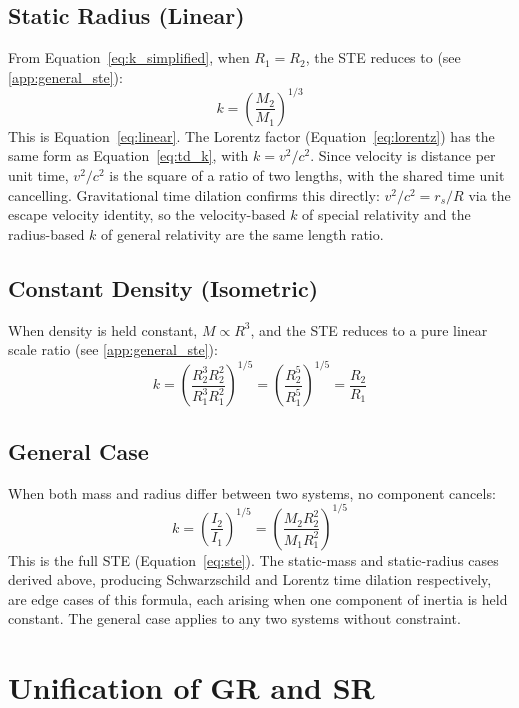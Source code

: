 \subsection{Static Radius (Linear)}
From Equation~\ref{eq:k_simplified}, when $R_1 = R_2$, the STE reduces to (see \ref{app:general_ste}):
\begin{equation}
k = \left(\frac{M_2}{M_1}\right)^{1/3}
\end{equation}
This is Equation~\ref{eq:linear}. The Lorentz factor (Equation~\ref{eq:lorentz}) has the same form as Equation~\ref{eq:td_k}, with $k = v^2/c^2$. Since velocity is distance per unit time, $v^2/c^2$ is the square of a ratio of two lengths, with the shared time unit cancelling. Gravitational time dilation confirms this directly: $v^2/c^2 = r_s/R$ via the escape velocity identity, so the velocity-based $k$ of special relativity and the radius-based $k$ of general relativity are the same length ratio.

\subsection{Constant Density (Isometric)}
When density is held constant, $M \propto R^3$, and the STE reduces to a pure linear scale ratio (see \ref{app:general_ste}):
\begin{equation}
k = \left(\frac{R_2^3 R_2^2}{R_1^3 R_1^2}\right)^{1/5} = \left(\frac{R_2^5}{R_1^5}\right)^{1/5} = \frac{R_2}{R_1}
\end{equation}

\subsection{General Case}
When both mass and radius differ between two systems, no component cancels:
\begin{equation}
k = \left(\frac{I_2}{I_1}\right)^{1/5} = \left(\frac{M_2 R_2^2}{M_1 R_1^2}\right)^{1/5}
\end{equation}
This is the full STE (Equation~\ref{eq:ste}). The static-mass and static-radius cases derived above, producing Schwarzschild and Lorentz time dilation respectively, are edge cases of this formula, each arising when one component of inertia is held constant. The general case applies to any two systems without constraint.

\section{Unification of GR and SR}

